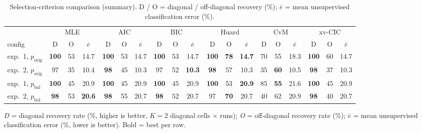 \begin{table}[htbp]
  \centering
  \caption{Selection-criterion comparison (summary). D / O = diagonal / off-diagonal recovery (\%); $\bar{e}$ = mean unsupervised classification error (\%).}
  \label{tab:exp4-summary}
  \footnotesize
  \begin{tabular}{l ccc ccc ccc ccc ccc ccc }
    \toprule
    & \multicolumn{3}{c}{MLE} & \multicolumn{3}{c}{AIC} & \multicolumn{3}{c}{BIC} & \multicolumn{3}{c}{Huard} & \multicolumn{3}{c}{CvM} & \multicolumn{3}{c}{xv-CIC} \\
    \cmidrule(lr){2-4}\cmidrule(lr){5-7}\cmidrule(lr){8-10}\cmidrule(lr){11-13}\cmidrule(lr){14-16}\cmidrule(lr){17-19}
    config  & D & O & $\bar{e}$ & D & O & $\bar{e}$ & D & O & $\bar{e}$ & D & O & $\bar{e}$ & D & O & $\bar{e}$ & D & O & $\bar{e}$ \\
    \midrule
    exp.\ 1, $p_{\text{orig}}$ & \textbf{100} & 53 & 14.7 & \textbf{100} & 53 & 14.7 & \textbf{100} & 53 & 14.7 & \textbf{100} & \textbf{78} & \textbf{14.7} & 70 & 55 & 18.3 & \textbf{100} & 60 & 14.7 \\
    exp.\ 2, $p_{\text{orig}}$ & 97 & 35 & 10.4 & \textbf{98} & 45 & 10.3 & 97 & 52 & \textbf{10.3} & \textbf{98} & 57 & 10.3 & 35 & \textbf{60} & 10.5 & \textbf{98} & 37 & 10.3 \\
    exp.\ 1, $p_{\text{bal}}$ & \textbf{100} & 45 & 20.9 & \textbf{100} & 45 & 20.9 & \textbf{100} & 45 & 20.9 & \textbf{100} & 53 & \textbf{20.9} & 85 & \textbf{55} & 21.6 & \textbf{100} & 45 & 20.9 \\
    exp.\ 2, $p_{\text{bal}}$ & \textbf{98} & 53 & \textbf{20.6} & \textbf{98} & 55 & 20.7 & \textbf{98} & 52 & 20.7 & 97 & \textbf{70} & 20.7 & 40 & 62 & 20.9 & \textbf{98} & 40 & 20.7 \\
    \bottomrule
  \end{tabular}
  \par\smallskip
  \emph{D} = diagonal recovery rate (\%, higher is better, $K{=}2$ diagonal cells $\times$ runs); \emph{O} = off-diagonal recovery rate (\%); $\bar{e}$ = mean unsupervised classification error (\%, lower is better). Bold = best per row.
\end{table}

